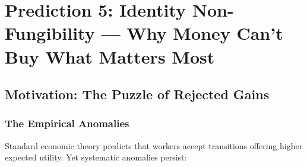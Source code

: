 \section{Prediction 5: Identity Non-Fungibility --- Why Money Can't Buy What Matters Most}
\label{app:prediction-identity}


\begin{abstract}
This appendix provides the complete technical foundation for Prediction 5 of the 
Complementarity-Context Framework: that identity constitutes a distinct welfare 
dimension that is not fungible with financial compensation. We develop the formal 
model of identity utility ($U^{IDN}$), estimate the identity-financial exchange 
rate, validate against job transition data and retraining program outcomes, and 
derive conditions under which compensation policies succeed or fail. The analysis 
explains why coal miners reject solar jobs, why displaced workers refuse higher 
wages, and why ``just retrain them'' consistently underperforms expectations.
\end{abstract}

\subsection{Motivation: The Puzzle of Rejected Gains}

\subsubsection{The Empirical Anomalies}

Standard economic theory predicts that workers accept transitions offering 
higher expected utility. Yet systematic anomalies persist:


